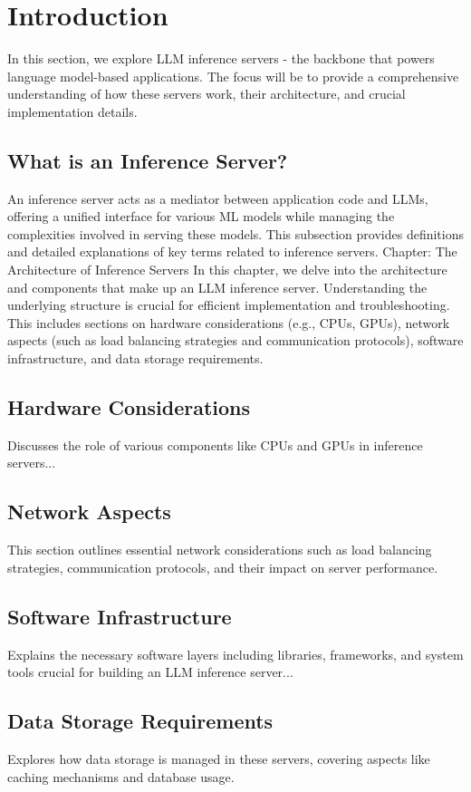 \section{Introduction}
In this section, we explore LLM inference servers - the backbone that powers language model-based applications. The focus will be to provide a comprehensive understanding of how these servers work, their architecture, and crucial implementation details.


\subsection{What is an Inference Server?}
An inference server acts as a mediator between application code and LLMs, offering a unified interface for various ML models while managing the complexities involved in serving these models. This subsection provides definitions and detailed explanations of key terms related to inference servers.
Chapter: The Architecture of Inference Servers
In this chapter, we delve into the architecture and components that make up an LLM inference server. Understanding the underlying structure is crucial for efficient implementation and troubleshooting. This includes sections on hardware considerations (e.g., CPUs, GPUs), network aspects (such as load balancing strategies and communication protocols), software infrastructure, and data storage requirements.
\subsection{Hardware Considerations}
Discusses the role of various components like CPUs and GPUs in inference servers...


\subsection{Network Aspects}
This section outlines essential network considerations such as load balancing strategies, communication protocols, and their impact on server performance.


\subsection{Software Infrastructure}
Explains the necessary software layers including libraries, frameworks, and system tools crucial for building an LLM inference server...


\subsection{Data Storage Requirements}
Explores how data storage is managed in these servers, covering aspects like caching mechanisms and database usage.


